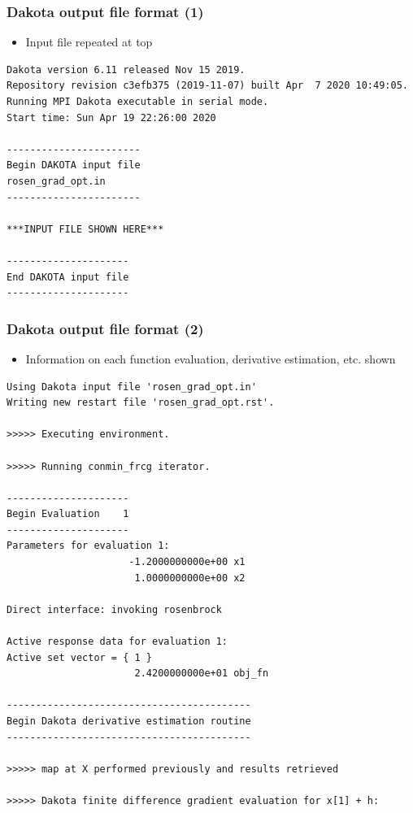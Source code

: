 \documentclass[t]{beamer}
\begin{document}
\begin{frame}[fragile]
  \frametitle{Dakota output file format (1)}
  \begin{itemize}
    \item Input file repeated at top
  \end{itemize}
  \begin{tiny}\begin{lstlisting}
Dakota version 6.11 released Nov 15 2019.
Repository revision c3efb375 (2019-11-07) built Apr  7 2020 10:49:05.
Running MPI Dakota executable in serial mode.
Start time: Sun Apr 19 22:26:00 2020

-----------------------
Begin DAKOTA input file
rosen_grad_opt.in
-----------------------

***INPUT FILE SHOWN HERE***

---------------------
End DAKOTA input file
---------------------\end{lstlisting}\end{tiny}
\end{frame}


\begin{frame}[fragile]
  \frametitle{Dakota output file format (2)}
  \begin{itemize}
    \item Information on each function evaluation, derivative estimation, etc.
          shown
  \end{itemize}
  \begin{tiny}\begin{lstlisting}
Using Dakota input file 'rosen_grad_opt.in'
Writing new restart file 'rosen_grad_opt.rst'.

>>>>> Executing environment.

>>>>> Running conmin_frcg iterator.

---------------------
Begin Evaluation    1
---------------------
Parameters for evaluation 1:
                     -1.2000000000e+00 x1
                      1.0000000000e+00 x2

Direct interface: invoking rosenbrock

Active response data for evaluation 1:
Active set vector = { 1 }
                      2.4200000000e+01 obj_fn

------------------------------------------
Begin Dakota derivative estimation routine
------------------------------------------

>>>>> map at X performed previously and results retrieved

>>>>> Dakota finite difference gradient evaluation for x[1] + h:\end{lstlisting}\end{tiny}
\end{frame}
\end{document}

